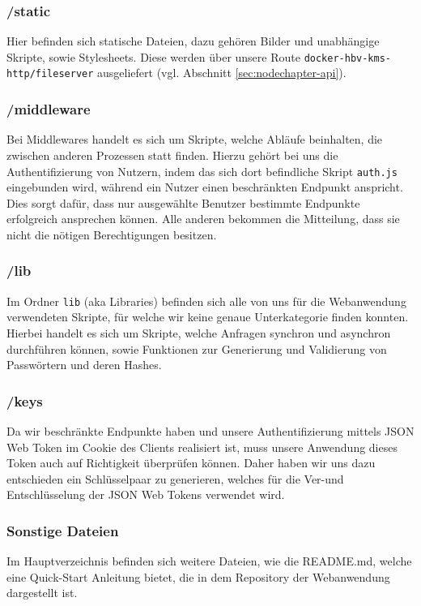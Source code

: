 \subsubsection*{/static}
Hier befinden sich statische Dateien, dazu gehören Bilder und unabhängige Skripte, sowie Stylesheets. Diese werden über unsere Route \verb|docker-hbv-kms-http/fileserver| ausgeliefert (vgl. Abschnitt \ref{sec:nodechapter-api}).

\subsubsection*{/middleware}
Bei Middlewares handelt es sich um Skripte, welche Abläufe beinhalten, die zwischen anderen Prozessen statt finden. Hierzu gehört bei uns die Authentifizierung von Nutzern, indem das sich dort befindliche Skript \verb|auth.js| eingebunden wird, während ein Nutzer einen beschränkten Endpunkt anspricht. Dies sorgt dafür, dass nur ausgewählte Benutzer bestimmte Endpunkte erfolgreich ansprechen können. Alle anderen bekommen die Mitteilung, dass sie nicht die nötigen Berechtigungen besitzen.

\subsubsection*{/lib}
Im Ordner \verb|lib| (aka Libraries) befinden sich alle von uns für die Webanwendung verwendeten Skripte, für welche wir keine genaue Unterkategorie finden konnten. Hierbei handelt es sich um Skripte, welche Anfragen synchron und asynchron durchführen können, sowie Funktionen zur Generierung und Validierung von Passwörtern und deren Hashes.

\subsubsection*{/keys}
Da wir beschränkte Endpunkte haben und unsere Authentifizierung mittels JSON Web Token im Cookie des Clients realisiert ist, muss unsere Anwendung dieses Token auch auf Richtigkeit überprüfen können. Daher haben wir uns dazu entschieden ein Schlüsselpaar zu generieren, welches für die Ver-und Entschlüsselung der JSON Web Tokens verwendet wird.\\

\subsubsection*{Sonstige Dateien}
\label{sec:node-other-files}
Im Hauptverzeichnis befinden sich weitere Dateien, wie die README.md, welche eine Quick-Start Anleitung bietet, die in dem Repository der Webanwendung dargestellt ist.

